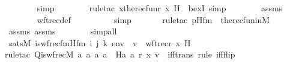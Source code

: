 \begin{isabellebody}
\ \ \ \ \ \ \isamarkupfalse%
\ simp\ \isanewline
\ \ \ \ \ \ \isamarkupfalse%
{\isacharparenleft}{\kern0pt}rule{\isacharunderscore}{\kern0pt}tac\ x{\isacharequal}{\kern0pt}{\isachardoublequoteopen}the{\isacharunderscore}{\kern0pt}recfun{\isacharparenleft}{\kern0pt}r{\isacharcomma}{\kern0pt}\ x{\isacharcomma}{\kern0pt}\ H{\isacharparenright}{\kern0pt}{\isachardoublequoteclose}\ \ bexI{\isacharcomma}{\kern0pt}\ simp{\isacharparenright}{\kern0pt}\isanewline
\ \ \ \ \ \ \isamarkupfalse%
\ assms{}\ \isanewline
\ \ \ \ \ \ \isamarkupfalse%
\ wftrec{\isacharunderscore}{\kern0pt}def\ \isanewline
\ \ \ \ \ \ \ \isamarkupfalse%
\ simp\isanewline
\ \ \ \ \ \ \isamarkupfalse%
{\isacharparenleft}{\kern0pt}rule{\isacharunderscore}{\kern0pt}tac\ p{\isacharequal}{\kern0pt}Hfm\ \ the{\isacharunderscore}{\kern0pt}recfun{\isacharunderscore}{\kern0pt}in{\isacharunderscore}{\kern0pt}M{\isacharparenright}{\kern0pt}\isanewline
\ \ \ \ \ \ \isamarkupfalse%
\ assms\ assms{}\isanewline
\ \ \ \ \ \ \isamarkupfalse%
\ simp{\isacharunderscore}{\kern0pt}all\isanewline
\ \ \isamarkupfalse%
\isanewline
\isanewline
\ \ \isamarkupfalse%
\ {\isachardoublequoteopen}sats{\isacharparenleft}{\kern0pt}M{\isacharcomma}{\kern0pt}\ is{\isacharunderscore}{\kern0pt}wfrec{\isacharunderscore}{\kern0pt}fm{\isacharparenleft}{\kern0pt}Hfm{\isacharcomma}{\kern0pt}\ i{\isacharcomma}{\kern0pt}\ j{\isacharcomma}{\kern0pt}\ k{\isacharparenright}{\kern0pt}{\isacharcomma}{\kern0pt}\ env{\isacharparenright}{\kern0pt}\ {\isasymlongleftrightarrow}\ v\ {\isacharequal}{\kern0pt}\ wftrec{\isacharparenleft}{\kern0pt}r{\isacharcomma}{\kern0pt}\ x{\isacharcomma}{\kern0pt}\ H{\isacharparenright}{\kern0pt}{\isachardoublequoteclose}\ \isanewline
\ \ \ \ \isamarkupfalse%
{\isacharparenleft}{\kern0pt}rule{\isacharunderscore}{\kern0pt}tac\ Q{\isacharequal}{\kern0pt}{\isachardoublequoteopen}is{\isacharunderscore}{\kern0pt}wfrec{\isacharparenleft}{\kern0pt}{\isacharhash}{\kern0pt}{\isacharhash}{\kern0pt}M{\isacharcomma}{\kern0pt}\ {\isasymlambda}a{}\ a{}\ a{}{\isachardot}{\kern0pt}\ a{}\ {\isacharequal}{\kern0pt}\ H{\isacharparenleft}{\kern0pt}a{}{\isacharcomma}{\kern0pt}\ a{}{\isacharparenright}{\kern0pt}{\isacharcomma}{\kern0pt}\ r{\isacharcomma}{\kern0pt}\ x{\isacharcomma}{\kern0pt}\ v{\isacharparenright}{\kern0pt}{\isachardoublequoteclose}\ \ iff{\isacharunderscore}{\kern0pt}trans{\isacharcomma}{\kern0pt}\ rule\ iff{\isacharunderscore}{\kern0pt}flip{\isacharparenright}{\kern0pt}\isanewline

\end{isabellebody}
